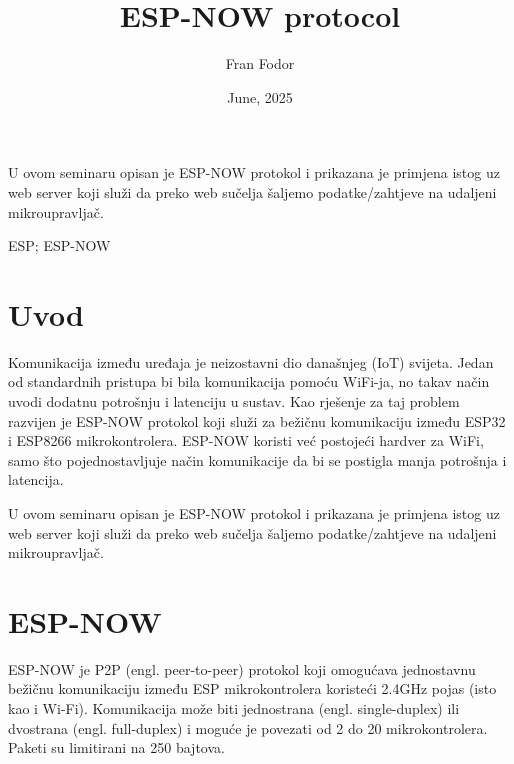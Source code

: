 \documentclass[seminarskirad]{fer}
\title{ESP-NOW protocol}
\author{Fran Fodor}
\date{June, 2025}
\begin{document}
\maketitle


\mainmatter



\begin{sazetak}
  U ovom seminaru opisan je ESP-NOW protokol i prikazana je primjena istog uz web server koji služi da preko web sučelja šaljemo podatke/zahtjeve na udaljeni mikroupravljač.
\end{sazetak}

\begin{kljucnerijeci}
  ESP; ESP-NOW
\end{kljucnerijeci}


\tableofcontents


\chapter{Uvod}
\label{pog:uvod}

Komunikacija između uređaja je neizostavni dio današnjeg (IoT) svijeta. Jedan od standardnih pristupa bi bila komunikacija pomoću WiFi-ja, no takav način uvodi dodatnu potrošnju i latenciju u sustav. Kao rješenje za taj problem razvijen je ESP-NOW protokol koji služi za bežičnu komunikaciju između ESP32 i ESP8266 mikrokontrolera. ESP-NOW koristi već postojeći hardver za WiFi, samo što pojednostavljuje način komunikacije da bi se postigla manja potrošnja i latencija. 

U ovom seminaru opisan je ESP-NOW protokol i prikazana je primjena istog uz web server koji služi da preko web sučelja šaljemo podatke/zahtjeve na udaljeni mikroupravljač.

\chapter{ESP-NOW}
\label{pog:uvod_u_espnow}

ESP-NOW je P2P (engl. peer-to-peer) protokol koji omogućava jednostavnu bežičnu komunikaciju između ESP mikrokontrolera koristeći 2.4GHz pojas (isto kao i Wi-Fi). Komunikacija može biti jednostrana (engl. single-duplex) ili dvostrana (engl. full-duplex) i moguće je povezati od 2 do 20 mikrokontrolera. Paketi su limitirani na 250 bajtova.
\end{document}
